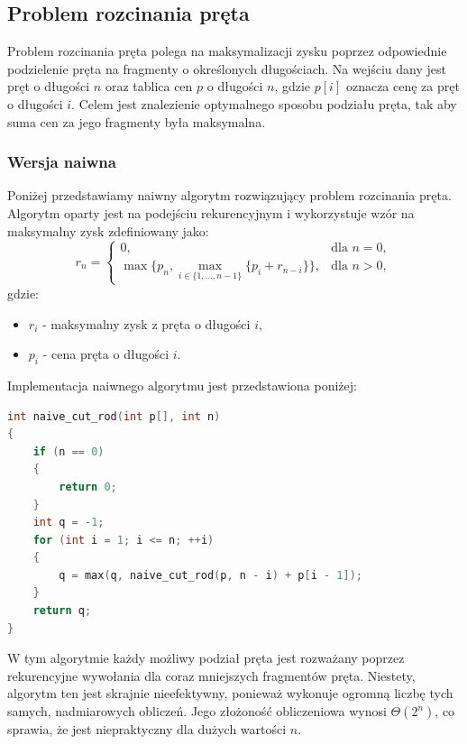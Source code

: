 \documentclass{article}
\begin{document}
\subsection{Problem rozcinania pręta}
Problem rozcinania pręta polega na maksymalizacji zysku poprzez odpowiednie podzielenie pręta na fragmenty o określonych długościach. Na wejściu dany jest pręt o długości $n$ oraz tablica cen $p$ o długości $n$, gdzie $p[i]$ oznacza cenę za pręt o długości $i$. Celem jest znalezienie optymalnego sposobu podziału pręta, tak aby suma cen za jego fragmenty była maksymalna.

\subsubsection{Wersja naiwna}

Poniżej przedstawiamy naiwny algorytm rozwiązujący problem rozcinania pręta. Algorytm oparty jest na podejściu rekurencyjnym i wykorzystuje wzór na maksymalny zysk zdefiniowany jako:
\begin{equation}
   r_n = 
   \begin{cases}
   0, & \text{dla } n = 0, \\
   \max \{ p_n, \max_{i \in \{1, \dots, n-1\}} \{ p_i + r_{n-i} \} \}, & \text{dla } n > 0,
   \end{cases}
\nonumber
\end{equation}
gdzie:
\begin{itemize}
    \item $r_i$ - maksymalny zysk z pręta o długości $i$,
    \item $p_i$ - cena pręta o długości $i$.
\end{itemize}

Implementacja naiwnego algorytmu jest przedstawiona poniżej:
\begin{lstlisting}[style=mystyle, language=C++, caption={Implementacja \texttt{naive\_cut\_rod}}, label={lst:naive_cut_rod}]
int naive_cut_rod(int p[], int n)
{
    if (n == 0)
    {
        return 0;
    }
    int q = -1;
    for (int i = 1; i <= n; ++i)
    {
        q = max(q, naive_cut_rod(p, n - i) + p[i - 1]);
    }
    return q;
}
\end{lstlisting}

W tym algorytmie każdy możliwy podział pręta jest rozważany poprzez rekurencyjne wywołania dla coraz mniejszych fragmentów pręta. Niestety, algorytm ten jest skrajnie nieefektywny, ponieważ wykonuje ogromną liczbę tych samych, nadmiarowych obliczeń. Jego złożoność obliczeniowa wynosi $\Theta(2^n)$, co sprawia, że jest niepraktyczny dla dużych wartości $n$.
\end{document}
